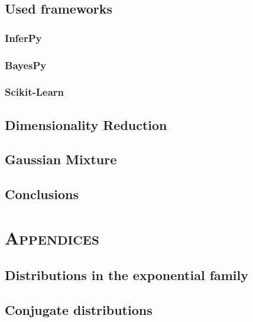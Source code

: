 \documentclass[twoside,openright,titlepage,numbers=noenddot,openany,headinclude,footinclude=true, cleardoublepage=empty,abstractoff,BCOR=5mm,paper=a4,fontsize=11pt, dvipsnames]{scrreprt}
\begin{document}
\chapter{Used frameworks}

\section{InferPy}

\section{BayesPy}

\section{Scikit-Learn}


\chapter{Dimensionality Reduction}


\chapter{Gaussian Mixture}


\clearpage

\chapter*{Conclusions}



\ctparttext{
  \color{black}
  \begin{center}

  \end{center}
}
\part*{\textsc{Appendices}}

\appendix
\chapter{Distributions in the exponential family}\label{ap:exp_fam}


\chapter{Conjugate distributions}\label{ap:conj_distr}



\clearpage

\printglossary[title={\textsc{notation}}]
\glsaddallunused

\clearpage
\nocite{*}


\end{document}
